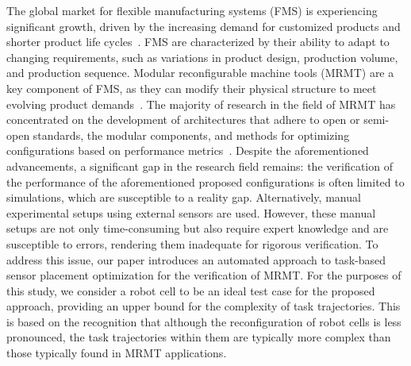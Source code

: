 \documentclass{svproc}
\begin{document}
The global market for flexible manufacturing systems (FMS) is experiencing significant growth, driven by the increasing demand for customized products and shorter product life cycles~\cite{westkaemperEinfuehrungOrganisationProduktion2006}. FMS are characterized by their ability to adapt to changing requirements, such as variations in product design, production volume, and production sequence. Modular reconfigurable machine tools (MRMT) are a key component of FMS, as they can modify their physical structure to meet evolving product demands~\cite{Padayachee2012}.
The majority of research in the field of MRMT has concentrated on the development of architectures that adhere to open or semi-open standards, the modular components, and methods for optimizing configurations based on performance metrics~\cite{gadallaRecentAdvancesResearch2017, xuMethodDesignModular2017}.
Despite the aforementioned advancements, a significant gap in the research field remains: the verification of the performance of the aforementioned proposed configurations is often limited to simulations, which are susceptible to a reality gap. Alternatively, manual experimental setups using external sensors are used. However, these manual setups are not only time-consuming but also require expert knowledge and are susceptible to errors, rendering them inadequate for rigorous verification.
To address this issue, our paper introduces an automated approach to task-based sensor placement optimization for the verification of MRMT. For the purposes of this study, we consider a robot cell to be an ideal test case for the proposed approach, providing an upper bound for the complexity of task trajectories. This is based on the recognition that although the reconfiguration of robot cells is less pronounced, the task trajectories within them are typically more complex than those typically found in MRMT applications.
\end{document}
